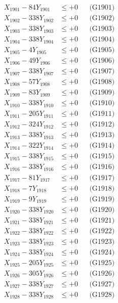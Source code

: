 \documentclass[a4paper,10pt]{article}
\begin{document}
{\begin{align}
\allowbreak
X_{1901} - 84Y_{1901} &\leq +0 && \text{(G1901)} \\
X_{1902} - 338Y_{1902} &\leq +0 && \text{(G1902)} \\
X_{1903} - 338Y_{1903} &\leq +0 && \text{(G1903)} \\
X_{1904} - 338Y_{1904} &\leq +0 && \text{(G1904)} \\
X_{1905} - 4Y_{1905} &\leq +0 && \text{(G1905)} \\
X_{1906} - 49Y_{1906} &\leq +0 && \text{(G1906)} \\
X_{1907} - 338Y_{1907} &\leq +0 && \text{(G1907)} \\
X_{1908} - 57Y_{1908} &\leq +0 && \text{(G1908)} \\
X_{1909} - 83Y_{1909} &\leq +0 && \text{(G1909)} \\
X_{1910} - 338Y_{1910} &\leq +0 && \text{(G1910)} \\
\allowbreak
X_{1911} - 205Y_{1911} &\leq +0 && \text{(G1911)} \\
X_{1912} - 324Y_{1912} &\leq +0 && \text{(G1912)} \\
X_{1913} - 338Y_{1913} &\leq +0 && \text{(G1913)} \\
X_{1914} - 322Y_{1914} &\leq +0 && \text{(G1914)} \\
X_{1915} - 338Y_{1915} &\leq +0 && \text{(G1915)} \\
X_{1916} - 338Y_{1916} &\leq +0 && \text{(G1916)} \\
X_{1917} - 81Y_{1917} &\leq +0 && \text{(G1917)} \\
X_{1918} - 7Y_{1918} &\leq +0 && \text{(G1918)} \\
X_{1919} - 9Y_{1919} &\leq +0 && \text{(G1919)} \\
X_{1920} - 338Y_{1920} &\leq +0 && \text{(G1920)} \\
\allowbreak
X_{1921} - 338Y_{1921} &\leq +0 && \text{(G1921)} \\
X_{1922} - 338Y_{1922} &\leq +0 && \text{(G1922)} \\
X_{1923} - 338Y_{1923} &\leq +0 && \text{(G1923)} \\
X_{1924} - 338Y_{1924} &\leq +0 && \text{(G1924)} \\
X_{1925} - 205Y_{1925} &\leq +0 && \text{(G1925)} \\
X_{1926} - 305Y_{1926} &\leq +0 && \text{(G1926)} \\
X_{1927} - 338Y_{1927} &\leq +0 && \text{(G1927)} \\
X_{1928} - 338Y_{1928} &\leq +0 && \text{(G1928)} \\

\end{align}}
\end{document}
